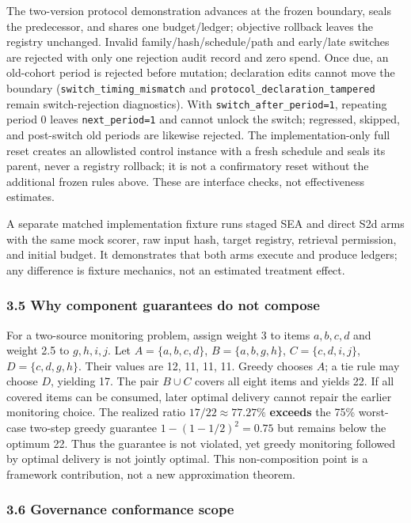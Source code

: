 \documentclass[
  11pt]{article}
\begin{document}
The two-version protocol demonstration advances at the frozen boundary,
seals the predecessor, and shares one budget/ledger; objective rollback
leaves the registry unchanged. Invalid family/hash/schedule/path and
early/late switches are rejected with only one rejection audit record
and zero spend. Once due, an old-cohort period is rejected before
mutation; declaration edits cannot move the boundary
(\texttt{switch\_timing\_mismatch} and
\texttt{protocol\_declaration\_tampered} remain switch-rejection
diagnostics). With \texttt{switch\_after\_period=1}, repeating period 0
leaves \texttt{next\_period=1} and cannot unlock the switch; regressed,
skipped, and post-switch old periods are likewise rejected. The
implementation-only full reset creates an allowlisted control instance
with a fresh schedule and seals its parent, never a registry rollback;
it is not a confirmatory reset without the additional frozen rules
above. These are interface checks, not effectiveness estimates.

A separate matched implementation fixture runs staged SEA and direct S2d
arms with the same mock scorer, raw input hash, target registry,
retrieval permission, and initial budget. It demonstrates that both arms
execute and produce ledgers; any difference is fixture mechanics, not an
estimated treatment effect.

\subsubsection{3.5 Why component guarantees do not
compose}\label{why-component-guarantees-do-not-compose}

For a two-source monitoring problem, assign weight 3 to items
\(a,b,c,d\) and weight 2.5 to \(g,h,i,j\). Let \(A=\{a,b,c,d\}\),
\(B=\{a,b,g,h\}\), \(C=\{c,d,i,j\}\), \(D=\{c,d,g,h\}\). Their values
are 12, 11, 11, 11. Greedy chooses \(A\); a tie rule may choose \(D\),
yielding 17. The pair \(B\cup C\) covers all eight items and yields 22.
If all covered items can be consumed, later optimal delivery cannot
repair the earlier monitoring choice. The realized ratio
\(17/22\approx77.27\%\) \textbf{exceeds} the 75\% worst-case two-step
greedy guarantee \(1-(1-1/2)^2=0.75\) but remains below the optimum 22.
Thus the guarantee is not violated, yet greedy monitoring followed by
optimal delivery is not jointly optimal. This non-composition point is a
framework contribution, not a new approximation theorem.

\subsubsection{3.6 Governance conformance
scope}\label{governance-conformance-scope}
\end{document}
